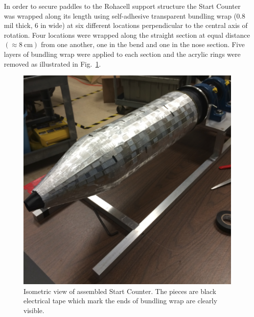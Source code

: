 In order to secure paddles to the Rohacell support structure the Start Counter was wrapped along its length using self-adhesive transparent bundling wrap (0.8 mil thick, 6 in wide) at six different locations perpendicular to the central axis of rotation. Four locations were wrapped along the straight section at equal distance $(\approx 8\ \mathrm{cm})$ from one another, one in the bend and one in the nose section.  Five layers of bundling wrap were applied to each section and the acrylic rings were removed as illustrated in Fig.~\ref{fig:st_iso_eel}.
\begin{figure}[tbph]
	\centering
	\includegraphics[width=0.8\columnwidth]{fabrication/figs/st_iso_eel}
	\caption[Isometric view of assembled Start Counter]{Isometric view of assembled Start Counter. The pieces are black electrical tape which mark the ends of bundling wrap are clearly visible.}
	\label{fig:st_iso_eel}
\end{figure}

